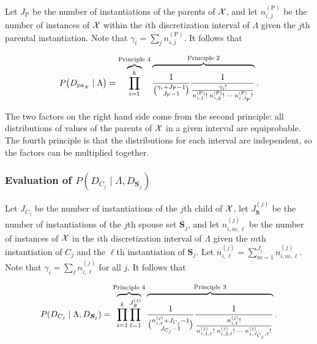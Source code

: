 Let $J_\text{P}$ be the number of instantiations of the parents of $\mathcal{X}$, and let $n^{(\text{P})}_{i,j}$ be the number of instances of $\mathcal{X}$ within the $i$th discretization interval of $\Lambda$ given the $j$th parental instantiation.
Note that $\gamma_i = \sum_j n^{(\text{P})}_{i,j}$.
It follows that

\begin{equation}
  \label{eq:likelihood_one}
  P\paren{D_{\Pa_{\cX}} \mid \Lambda} = \overbrace{\prod_{i=1}^k}^{\text{Principle 4}}
    \overbrace{\rule{0pt}{2em}
      \frac{1}{{{\gamma_i + J_\text{P} - 1}\choose{J_\text{P} - 1}}}
      \frac{1}{
        \frac{
          {\gamma_i}!
        }{
          {n^{(\text{P})}_{i,1}}! \; {n^{(\text{P})}_{i,2}}! \; \cdots \; {n^{(\text{P})}_{i,J_\text{P}}}!
        }
      }
    }^{\text{Principle 2}}\text{.}
\end{equation}

The two factors on the right hand side come from the second principle: all distributions of values of the parents of $\mathcal{X}$ in a given interval are equiprobable.
The fourth principle is that the distributions for each interval are independent, so the factors can be multiplied together.

\subsubsection{Evaluation of $P(D_{C_j} \mid \Lambda, D_{\bm{S}_j})$}
Let $J_{C_j}$ be the number of instantiations of the $j$th child of $\mathcal{X}$, let $J_{\bm{S}}^{(j)}$ be the number of instantiations of the $j$th spouse set $\bm{S}_j$, and let $n^{(j)}_{i,m,\ell}$ be the number of instances of $\mathcal{X}$ in the $i$th discretization interval of $\Lambda$ given the $m$th instantiation of $C_j$ and the $\ell$th instantiation of $\bm{S}_j$.
Let ${n^{(j)}_{i,\ell} = \sum_{m=1}^{J_j} n^{(j)}_{i,m,\ell}}$.
Note that ${\gamma_i = \sum_{\ell} n^{(j)}_{i,\ell}}$ for all $j$.
It follows that

\begin{equation}
  \label{eq:likelihood_two}
  P(D_{C_j} \mid \Lambda, D_{\bm{S}_j}) =
  \overbrace{\prod_{i=1}^{k} \prod_{\ell=1}^{J_{\bm{S}}^{(j)}}}^{\text{Principle 4}}
    \overbrace{\rule{0pt}{2.3em}
      {
        \frac{1}{
          {{n^{(j)}_{i,\ell} + J_{C_j} - 1}\choose{J_{C_j}-1}}}
        }
        {\frac{
          1
        }{
          \frac{
            {n^{(j)}_{i,\ell}}!
          }{
            {n^{(j)}_{i,1,\ell}!} \; {n^{(j)}_{i,2,\ell}!} \; \cdots \; {n^{(j)}_{i,J_{C_j},\ell}!}
          }
        }
      }
    }^{\text{Principle 3}}
    \text{.}
\end{equation}

